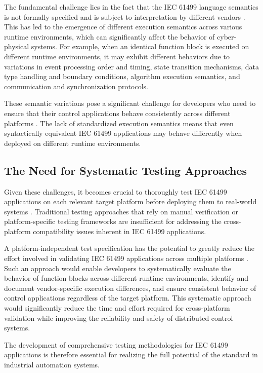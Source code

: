 The fundamental challenge lies in the fact that the IEC 61499 language semantics is not formally specified and is subject to interpretation by different vendors \cite{cengic_executionsemantics}. This has led to the emergence of different execution semantics across various runtime environments, which can significantly affect the behavior of cyber-physical systems. For example, when an identical function block is executed on different runtime environments, it may exhibit different behaviors due to variations in event processing order and timing, state transition mechanisms, data type handling and boundary conditions, algorithm execution semantics, and communication and synchronization protocols.

These semantic variations pose a significant challenge for developers who need to ensure that their control applications behave consistently across different platforms \cite{hopsu2019portability}. The lack of standardized execution semantics means that even syntactically equivalent IEC 61499 applications may behave differently when deployed on different runtime environments.

\subsection{The Need for Systematic Testing Approaches}

Given these challenges, it becomes crucial to thoroughly test IEC 61499 applications on each relevant target platform before deploying them to real-world systems \cite{hametner2014}. Traditional testing approaches that rely on manual verification or platform-specific testing frameworks are insufficient for addressing the cross-platform compatibility issues inherent in IEC 61499 applications.

A platform-independent test specification has the potential to greatly reduce the effort involved in validating IEC 61499 applications across multiple platforms \cite{softwareTesting}. Such an approach would enable developers to systematically evaluate the behavior of function blocks across different runtime environments, identify and document vendor-specific execution differences, and ensure consistent behavior of control applications regardless of the target platform. This systematic approach would significantly reduce the time and effort required for cross-platform validation while improving the reliability and safety of distributed control systems.

The development of comprehensive testing methodologies for IEC 61499 applications is therefore essential for realizing the full potential of the standard in industrial automation systems.

